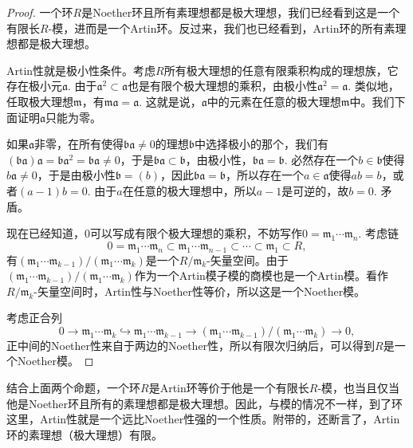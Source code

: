 \begin{proof}
	一个环$R$是Noether环且所有素理想都是极大理想，我们已经看到这是一个有限长$R$-模，进而是一个Artin环。反过来，我们也已经看到，Artin环的所有素理想都是极大理想。

	Artin性就是极小性条件。考虑$R$所有极大理想的任意有限乘积构成的理想族，它存在极小元$\mathfrak{a}$. 由于$\mathfrak{a}^2\subset \mathfrak{a}$也是有限个极大理想的乘积，由极小性$\mathfrak{a}^2=\mathfrak{a}$. 类似地，任取极大理想$\mathfrak{m}$，有$\mathfrak{m}\mathfrak{a}=\mathfrak{a}$. 这就是说，$\mathfrak{a}$中的元素在任意的极大理想$\mathfrak{m}$中。我们下面证明$\mathfrak{a}$只能为零。

	如果$\mathfrak{a}$非零，在所有使得$\mathfrak{b}\mathfrak{a}\neq 0$的理想$\mathfrak{b}$中选择极小的那个，我们有$(\mathfrak{b}\mathfrak{a})\mathfrak{a}=\mathfrak{b}\mathfrak{a}^2=\mathfrak{b}\mathfrak{a}\neq 0$，于是$\mathfrak{b}\mathfrak{a}\subset \mathfrak{b}$，由极小性，$\mathfrak{b}\mathfrak{a}=\mathfrak{b}$. 必然存在一个$b\in\mathfrak{b}$使得$b\mathfrak{a}\neq 0$，于是由极小性$\mathfrak{b}=(b)$，因此$\mathfrak{b}\mathfrak{a}=\mathfrak{b}$，所以存在一个$a\in \mathfrak{a}$使得$ab=b$，或者$(a-1)b=0$. 由于$a$在任意的极大理想中，所以$a-1$是可逆的，故$b=0$. 矛盾。

	现在已经知道，$0$可以写成有限个极大理想的乘积，不妨写作$0=\mathfrak{m}_1\cdots \mathfrak{m}_n$. 考虑链
	\[
	0=\mathfrak{m}_1\cdots \mathfrak{m}_n\subset \mathfrak{m}_1\cdots \mathfrak{m}_{n-1}\subset \cdots\subset \mathfrak{m}_1\subset R,
	\]
	有$(\mathfrak{m}_1\cdots \mathfrak{m}_{k-1})/(\mathfrak{m}_1\cdots \mathfrak{m}_{k})$是一个$R/\mathfrak{m}_{k}$-矢量空间。由于$(\mathfrak{m}_1\cdots \mathfrak{m}_{k-1})/(\mathfrak{m}_1\cdots \mathfrak{m}_{k})$作为一个Artin模子模的商模也是一个Artin模。看作$R/\mathfrak{m}_{k}$-矢量空间时，Artin性与Noether性等价，所以这是一个Noether模。

	考虑正合列
	\[
	0\to \mathfrak{m}_1\cdots \mathfrak{m}_{k}\hookrightarrow\mathfrak{m}_1\cdots \mathfrak{m}_{k-1}\to (\mathfrak{m}_1\cdots \mathfrak{m}_{k-1})/(\mathfrak{m}_1\cdots \mathfrak{m}_{k})\to 0,
	\]
	正中间的Noether性来自于两边的Noether性，所以有限次归纳后，可以得到$R$是一个Noether模。
\end{proof}

\para 结合上面两个命题，一个环$R$是Artin环等价于他是一个有限长$R$-模，也当且仅当他是Noether环且所有的素理想都是极大理想。因此，与模的情况不一样，到了环这里，Artin性就是一个远比Noether性强的一个性质。附带的，还断言了，Artin环的素理想（极大理想）有限。\endpara

